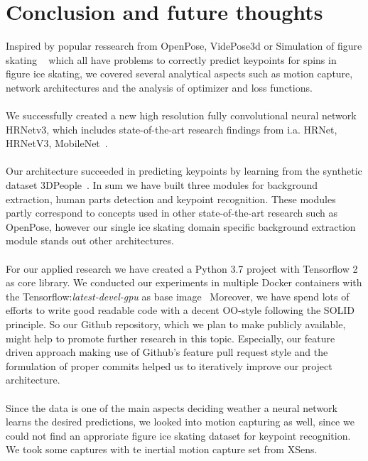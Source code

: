 \chapter{Conclusion and future thoughts}
\label{Conclusion}
Inspired by popular ressearch from OpenPose, VidePose3d or Simulation of figure skating ~\cite{openpose, videopose3d, figureskatingsimulation}
which all have problems to correctly predict keypoints for spins in figure ice skating, we covered several
analytical aspects such as motion capture, network architectures and the analysis of optimizer and loss functions.
\\\mbox{}\\
We successfully created a new high resolution fully convolutional neural network HRNetv3, which includes state-of-the-art
research findings from i.a. HRNet, HRNetV3, MobileNet~\cite{HRNetv1, HRNetv2, mobilenet}.
\\\mbox{}\\
Our architecture succeeded in predicting keypoints by learning from the synthetic dataset 3DPeople~\cite{3dpeople}.
In sum we have built three modules for background extraction, human parts detection and keypoint recognition.
These modules partly correspond to concepts used in other state-of-the-art research such as OpenPose, however our
single ice skating domain specific background extraction module stands out other architectures.
\\\mbox{}\\
For our applied research we have created a Python 3.7 project with Tensorflow 2~\cite{tensorflow2} as core library.
We conducted our experiments in multiple Docker containers with the Tensorflow:\textit{latest-devel-gpu} as base
image~\cite{tensorflowdocker}
Moreover, we have spend lots of efforts to write good readable code with a decent OO-style following the SOLID principle.
So our Github repository, which we plan to make publicly available, might help to promote further research in this topic.
Especially, our feature driven approach making use of Github's feature pull request style and the formulation of proper
commits helped us to iteratively improve our project architecture.
\\\mbox{}\\
Since the data is one of the main aspects deciding weather a neural network learns the desired predictions, we looked into
motion capturing as well, since we could not find an approriate figure ice skating dataset for keypoint recognition.
We took some captures with te inertial motion capture set from XSens.
